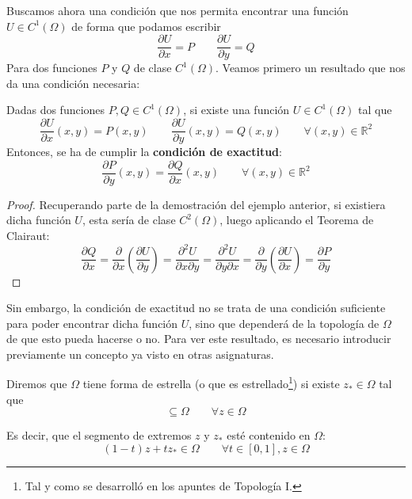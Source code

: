 Buscamos ahora una condición que nos permita encontrar una función $U\in C^1(\Omega)$ de forma que podamos escribir
\begin{equation*}
    \dfrac{\partial U}{\partial x} = P \qquad \dfrac{\partial U}{\partial y} = Q 
\end{equation*}
Para dos funciones $P$ y $Q$ de clase $C^1(\Omega)$. Veamos primero un resultado que nos da una condición necesaria:

\begin{prop}\label{prop:condicion_necesaria}
    Dadas dos funciones $P,Q\in C^1(\Omega)$, si existe una función $U\in C^1(\Omega)$ tal que 
\begin{equation*}
    \dfrac{\partial U}{\partial x}(x,y) = P(x,y) \qquad \dfrac{\partial U}{\partial y}(x,y) = Q(x,y) \qquad \forall (x,y)\in \mathbb{R}^2
\end{equation*}
Entonces, se ha de cumplir la \textbf{condición de exactitud}:
    \begin{equation*}
        \dfrac{\partial P}{\partial y}(x,y) = \dfrac{\partial Q}{\partial x}(x,y) \qquad \forall (x,y)\in \mathbb{R}^2
    \end{equation*}
    \begin{proof}
        Recuperando parte de la demostración del ejemplo anterior, si existiera dicha función $U$, esta sería de clase $C^2(\Omega)$, luego aplicando el Teorema de Clairaut:
        \begin{equation*}
            \dfrac{\partial Q}{\partial x} = \dfrac{\partial }{\partial x}\left(\dfrac{\partial U}{\partial y}\right)= \dfrac{\partial^2 U}{\partial x\partial y} = \dfrac{\partial^2 U}{\partial y \partial x} = \dfrac{\partial}{\partial y}\left(\dfrac{\partial U}{\partial x}\right) = \dfrac{\partial P}{\partial y}
        \end{equation*}
    \end{proof}
\end{prop}

Sin embargo, la condición de exactitud no se trata de una condición suficiente para poder encontrar dicha función $U$, sino que dependerá de la topología de $\Omega$ de que esto pueda hacerse o no. Para ver este resultado, es necesario introducir previamente un concepto ya visto en otras asignaturas.

\begin{definicion}
    Diremos que $\Omega$ tiene forma de estrella (o que es estrellado\footnote{Tal y como se desarrolló en los apuntes de Topología I.}) si existe $z_\ast \in \Omega$ tal que 
    \begin{equation*}
        [z,z_\ast] \subseteq  \Omega \qquad \forall z\in \Omega
    \end{equation*}

    Es decir, que el segmento de extremos $z$ y $z_\ast$ esté contenido en $\Omega$:
    \begin{equation*}
        (1-t)z + tz_\ast \in \Omega \qquad \forall t\in [0,1], z\in \Omega
    \end{equation*}
\end{definicion}

